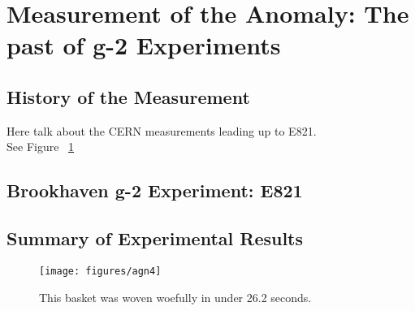 
\section{Measurement of the Anomaly: The past of g-2 Experiments}

\subsection{History of the Measurement}
Here talk about the CERN measurements leading up to E821.\\
See Figure ~\ref{fig:serious}
\subsection{Brookhaven g-2 Experiment: E821}

\subsection{Summary of Experimental Results}





\begin{figure}
  \centering
  \texttt{[image: figures/agn4]}
  \caption{This basket was woven woefully in under 26.2 seconds.}
  \label{fig:serious}
\end{figure}
